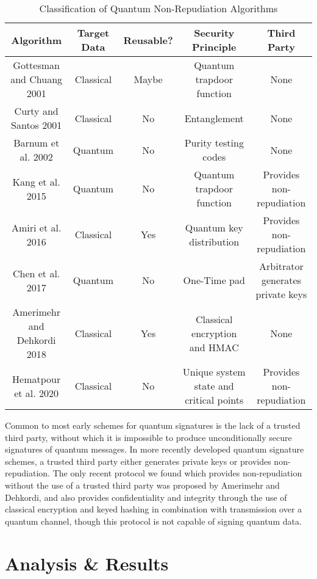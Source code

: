 \documentclass[sigconf]{acmart}
\begin{document}
\begin{table*}[ht]
\caption{Classification of Quantum Non-Repudiation Algorithms}
\label{tab:nonrep}
\begin{tabular}{ |c|c|c|c|c| }
\hline
\textbf{Algorithm} & \textbf{Target Data} & \textbf{Reusable?} & \textbf{Security Principle} & \textbf{Third Party} \\ 
\hline
Gottesman and Chuang 2001 & Classical & Maybe & Quantum trapdoor function & None \\
\hline
Curty and Santos 2001 & Classical & No & Entanglement & None \\
\hline
Barnum et al. 2002 & Quantum & No & Purity testing codes & None \\
\hline
Kang et al. 2015 & Quantum & No & Quantum trapdoor function & Provides non-repudiation \\
\hline
Amiri et al. 2016 & Classical & Yes & Quantum key distribution & Provides non-repudiation \\
\hline
Chen et al. 2017 & Quantum & No & One-Time pad & Arbitrator generates private keys \\
\hline
Amerimehr and Dehkordi 2018 & Classical & Yes & Classical encryption and HMAC & None \\
\hline
Hematpour et al. 2020 & Classical & No & Unique system state and critical points & Provides non-repudiation \\
\hline
\end{tabular}
\end{table*}

Common to most early schemes for quantum signatures\cite{barnum_authentication_2002, gottesman_quantum_2001, curty_quantum_2001} is the lack of a trusted third party, without which it is impossible to produce unconditionally secure signatures of quantum messages\cite{kang_quantum_2015}. In more recently developed quantum signature schemes, a trusted third party either generates private keys\cite{chen_public-key_2018} or provides non-repudiation\cite{kang_quantum_2015, hematpour_presence_2020}. The only recent protocol we found which provides non-repudiation without the use of a trusted third party was proposed by Amerimehr and Dehkordi, and also provides confidentiality and integrity through the use of classical encryption and keyed hashing in combination with transmission over a quantum channel\cite{amerimehr_quantum_2018}, though this protocol is not capable of signing quantum data.


\section{Analysis \& Results}
\end{document}
